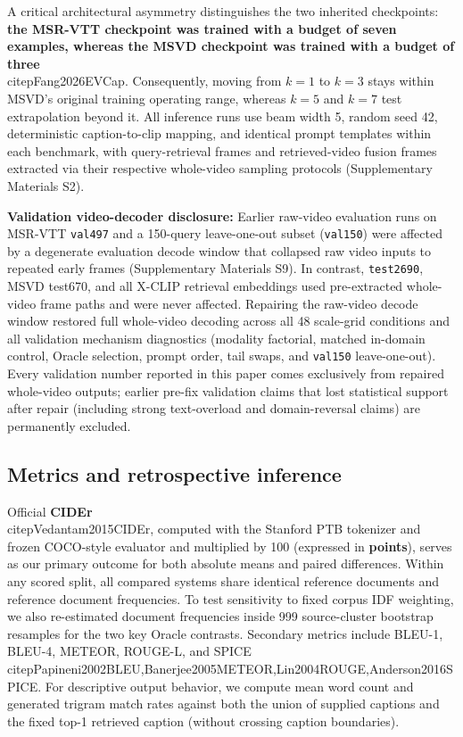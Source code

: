 \documentclass[11pt,a4paper]{article}
\begin{document}
A critical architectural asymmetry distinguishes the two inherited checkpoints: \textbf{the MSR-VTT checkpoint was trained with a budget of seven examples, whereas the MSVD checkpoint was trained with a budget of three} \\citep{Fang2026EVCap}. Consequently, moving from $k=1$ to $k=3$ stays within MSVD's original training operating range, whereas $k=5$ and $k=7$ test extrapolation beyond it. All inference runs use beam width 5, random seed 42, deterministic caption-to-clip mapping, and identical prompt templates within each benchmark, with query-retrieval frames and retrieved-video fusion frames extracted via their respective whole-video sampling protocols (Supplementary Materials S2).

\textbf{Validation video-decoder disclosure:} Earlier raw-video evaluation runs on MSR-VTT \texttt{val497} and a 150-query leave-one-out subset (\texttt{val150}) were affected by a degenerate evaluation decode window that collapsed raw video inputs to repeated early frames (Supplementary Materials S9). In contrast, \texttt{test2690}, MSVD test670, and all X-CLIP retrieval embeddings used pre-extracted whole-video frame paths and were never affected. Repairing the raw-video decode window restored full whole-video decoding across all 48 scale-grid conditions and all validation mechanism diagnostics (modality factorial, matched in-domain control, Oracle selection, prompt order, tail swaps, and \texttt{val150} leave-one-out). Every validation number reported in this paper comes exclusively from repaired whole-video outputs; earlier pre-fix validation claims that lost statistical support after repair (including strong text-overload and domain-reversal claims) are permanently excluded.

\subsection{Metrics and retrospective inference}
Official \textbf{CIDEr} \\citep{Vedantam2015CIDEr}, computed with the Stanford PTB tokenizer and frozen COCO-style evaluator and multiplied by 100 (expressed in \textbf{points}), serves as our primary outcome for both absolute means and paired differences. Within any scored split, all compared systems share identical reference documents and reference document frequencies. To test sensitivity to fixed corpus IDF weighting, we also re-estimated document frequencies inside 999 source-cluster bootstrap resamples for the two key Oracle contrasts. Secondary metrics include BLEU-1, BLEU-4, METEOR, ROUGE-L, and SPICE \\citep{Papineni2002BLEU,Banerjee2005METEOR,Lin2004ROUGE,Anderson2016SPICE}. For descriptive output behavior, we compute mean word count and generated trigram match rates against both the union of supplied captions and the fixed top-1 retrieved caption (without crossing caption boundaries).
\end{document}

